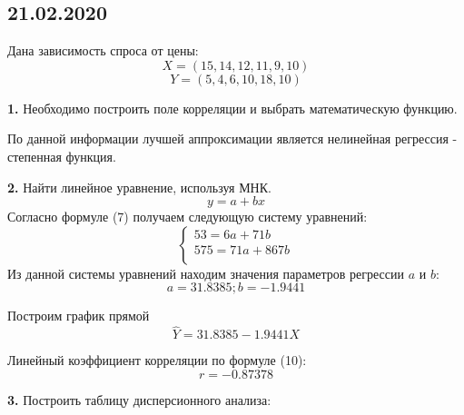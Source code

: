\documentclass[aps,%
12pt,%
final,%
oneside,
onecolumn,%
musixtex, %
superscriptaddress,%
centertags]{article} %
\begin{document}
\subsection{21.02.2020}

Дана зависимость спроса от цены:
$$ X = (15,14,12,11,9,10) $$
$$ Y = (5,4,6,10,18,10) $$

\textbf{1.} Необходимо построить поле корреляции и выбрать математическую функцию.

\begin{center}
\end{center}

По данной информации лучшей аппроксимации является нелинейная регрессия - степенная функция.

\textbf{2.} Найти линейное уравнение, используя МНК.
$$y = a + bx$$
Согласно формуле (7) получаем следующую систему уравнений:
$$ \left\{
\begin{matrix}
53 = 6a + 71b \\
575 = 71a + 867b \\
\end{matrix} \right. $$
Из данной системы уравнений находим значения параметров регрессии $a$ и $b$:
$$ a = 31.8385; b = -1.9441$$

Построим график прямой $$\widehat{Y} = 31.8385 -1.9441X$$
\begin{center}
\end{center}

Линейный коэффициент корреляции по формуле (10):
$$ r = -0.87378$$

\textbf{3.} Построить таблицу дисперсионного анализа:
\end{document}
